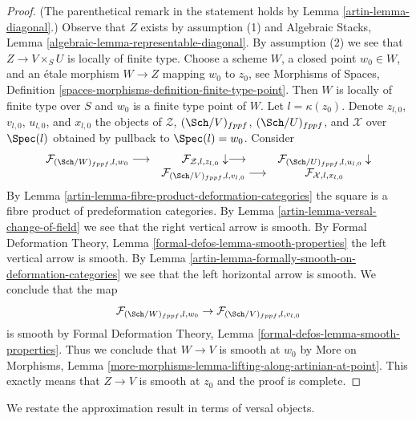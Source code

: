 \begin{proof}

(The parenthetical remark in the statement holds by
Lemma \ref{artin-lemma-diagonal}.)
Observe that $Z$ exists by assumption (1) and Algebraic Stacks, Lemma
\ref{algebraic-lemma-representable-diagonal}. By assumption (2) we see that
$Z \to V \times_S U$ is locally of finite type.
Choose a scheme $W$, a closed point $w_0 \in W$, and
an \'etale morphism $W \to Z$ mapping $w_0$ to $z_0$, see
Morphisms of Spaces, Definition
\ref{spaces-morphisms-definition-finite-type-point}.
Then $W$ is locally of finite type over $S$ and
$w_0$ is a finite type point of $W$.
Let $l = \kappa(z_0)$. Denote $z_{l, 0}$, $v_{l, 0}$,
$u_{l, 0}$, and $x_{l, 0}$ the objects of
$\mathcal{Z}$, $(\Sch/V)_{fppf}$, $(\Sch/U)_{fppf}$,
and $\mathcal{X}$ over $\Spec(l)$ obtained by pullback to $\Spec(l) = w_0$.
Consider
$$
\begin{array}{ccc}\mathcal{F}_{(\Sch/W)_{fppf}, l, w_0} \longrightarrow & \mathcal{F}_{\mathcal{Z}, l, z_{l, 0}} \downarrow\longrightarrow & \mathcal{F}_{(\Sch/U)_{fppf}, l, u_{l, 0}} \downarrow \\  & \mathcal{F}_{(\Sch/V)_{fppf}, l, v_{l, 0}} \longrightarrow & \mathcal{F}_{\mathcal{X}, l, x_{l, 0}}\end{array}
$$
By Lemma \ref{artin-lemma-fibre-product-deformation-categories}
the square is a fibre product of predeformation categories.
By Lemma \ref{artin-lemma-versal-change-of-field}
we see that the right vertical arrow is smooth.
By Formal Deformation Theory, Lemma
\ref{formal-defos-lemma-smooth-properties}
the left vertical arrow is smooth.
By Lemma \ref{artin-lemma-formally-smooth-on-deformation-categories}
we see that the left horizontal arrow is smooth.
We conclude that the map
$$
\mathcal{F}_{(\Sch/W)_{fppf}, l, w_0} \to
\mathcal{F}_{(\Sch/V)_{fppf}, l, v_{l, 0}}
$$
is smooth by Formal Deformation Theory, Lemma
\ref{formal-defos-lemma-smooth-properties}.
Thus we conclude that $W \to V$ is smooth at $w_0$ by
More on Morphisms, Lemma
\ref{more-morphisms-lemma-lifting-along-artinian-at-point}.
This exactly means that $Z \to V$ is smooth at $z_0$
and the proof is complete.
\end{proof}

We restate the approximation result in terms of
versal objects.

